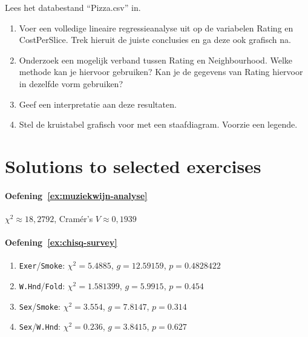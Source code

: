 \begin{exercise}
  \label{ex:pizza}
  Lees het databestand ``Pizza.csv'' in.
  \begin{enumerate}
    \item Voer een volledige lineaire regressieanalyse uit op de variabelen Rating en CostPerSlice. Trek hieruit de juiste conclusies en ga deze ook grafisch na.
    \item Onderzoek een mogelijk verband tussen Rating en Neighbourhood. Welke methode kan je hiervoor gebruiken? Kan je de gegevens van Rating hiervoor in dezelfde vorm gebruiken?
    \item Geef een interpretatie aan deze resultaten.
    \item Stel de kruistabel grafisch voor met een staafdiagram.  Voorzie een legende.
  \end{enumerate}
\end{exercise}





\section{Solutions to selected exercises}
\label{ssec:analyse-2-variabelen-oplossingen}

\paragraph{Oefening~\ref{ex:muziekwijn-analyse}}

$\chi^2 \approx 18,2792$, Cramér's $V \approx 0,1939$

\paragraph{Oefening~\ref{ex:chisq-survey}}

\begin{enumerate}
  \item \texttt{Exer}/\texttt{Smoke}: $\chi^2 = 5.4885$, $g = 12.59159$, $p = 0.4828422$
  \item \texttt{W.Hnd}/\texttt{Fold}: $\chi^2 = 1.581399$, $g = 5.9915$, $p = 0.454$
  \item \texttt{Sex}/\texttt{Smoke}: $\chi^2 = 3.554$, $g = 7.8147$, $p = 0.314$
  \item \texttt{Sex}/\texttt{W.Hnd}: $\chi^2 = 0.236$, $g = 3.8415$, $p = 0.627$
\end{enumerate}

